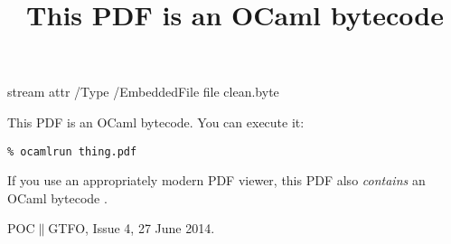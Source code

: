 \documentclass{article}
\title{This PDF is an OCaml bytecode}
\date{}
\begin{document}
\begingroup\relax
\immediate\pdfobj stream
attr {/Type /EmbeddedFile} file {clean.byte}
\immediate{}
\endgroup

\maketitle

This PDF is an OCaml bytecode.
You can execute it:
\begin{lstlisting}
% ocamlrun thing.pdf
\end{lstlisting}

If you use an appropriately modern PDF viewer, this PDF also \emph{contains}
an OCaml bytecode \cite{pocgtfo4}.

\begin{thebibliography}{9}

  {POC$\|$GTFO, Issue 4},
  27 June 2014.

\end{thebibliography}
\end{document}
